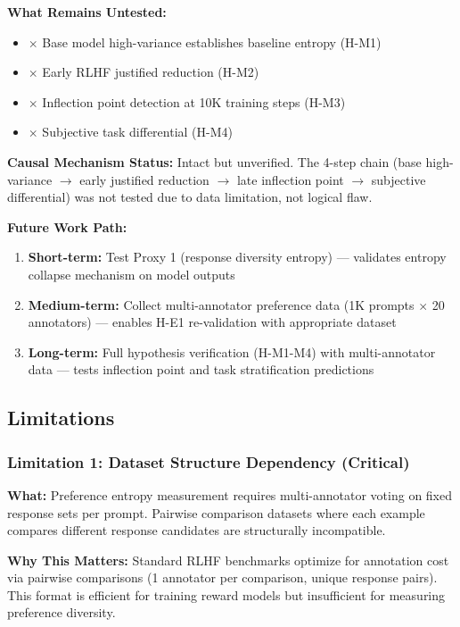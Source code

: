 \textbf{What Remains Untested:}
\begin{itemize}
\item $\times$ Base model high-variance establishes baseline entropy (H-M1)
\item $\times$ Early RLHF justified reduction (H-M2)
\item $\times$ Inflection point detection at 10K training steps (H-M3)
\item $\times$ Subjective task differential (H-M4)
\end{itemize}

\textbf{Causal Mechanism Status:} Intact but unverified. The 4-step chain (base high-variance $\rightarrow$ early justified reduction $\rightarrow$ late inflection point $\rightarrow$ subjective differential) was not tested due to data limitation, not logical flaw.

\textbf{Future Work Path:}
\begin{enumerate}
\item \textbf{Short-term:} Test Proxy 1 (response diversity entropy) — validates entropy collapse mechanism on model outputs
\item \textbf{Medium-term:} Collect multi-annotator preference data (1K prompts $\times$ 20 annotators) — enables H-E1 re-validation with appropriate dataset
\item \textbf{Long-term:} Full hypothesis verification (H-M1-M4) with multi-annotator data — tests inflection point and task stratification predictions
\end{enumerate}

\subsection{Limitations}

\subsubsection{Limitation 1: Dataset Structure Dependency (Critical)}

\textbf{What:} Preference entropy measurement requires multi-annotator voting on fixed response sets per prompt. Pairwise comparison datasets where each example compares different response candidates are structurally incompatible.

\textbf{Why This Matters:} Standard RLHF benchmarks optimize for annotation cost via pairwise comparisons (1 annotator per comparison, unique response pairs). This format is efficient for training reward models but insufficient for measuring preference diversity.

